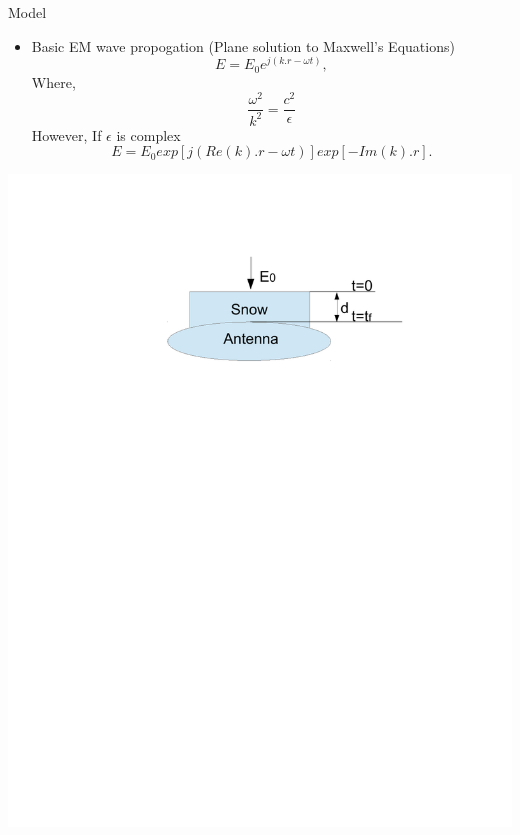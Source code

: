 \documentclass{beamer}
\begin{document}
\begin{frame}{Model}
\begin{itemize}
\item Basic EM wave propogation (Plane solution to Maxwell's Equations)
  \begin{equation}
    E = E_0e^{j(k.r -\omega t)},
  \end{equation}
  Where,
  \begin{equation*}
    \frac{\omega^2}{k^2}=\frac{c^2}{\epsilon}
  \end{equation*}
  However, If $\epsilon$ is complex
  \begin{equation}
    E = E_0 exp[j (Re(k).r - \omega t)]exp[-Im(k).r].
  \end{equation}
\end{itemize}
\begin{center}
\includegraphics[width=0.8\linewidth,trim=100 100 100 100, clip=true]{model1.pdf}
\end{center}
\end{frame}
\end{document}
